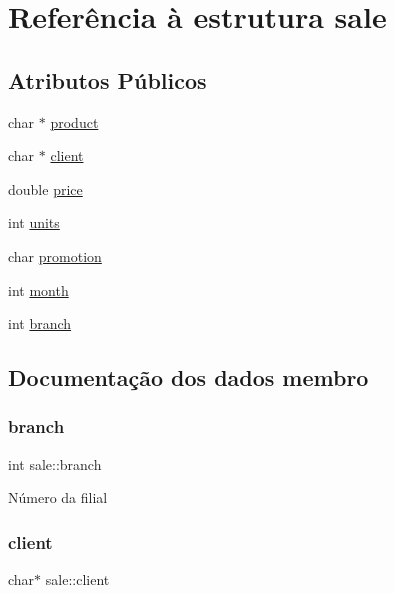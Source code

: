 \hypertarget{structsale}{}\section{Referência à estrutura sale}
\label{structsale}
\subsection*{Atributos Públicos}
\begin{DoxyCompactItemize}
\item 
char $\ast$ \hyperlink{structsale_af5a0d80c7b391b3af4086f9f2b6dfc33}{product}
\item 
char $\ast$ \hyperlink{structsale_a06b3ef63675cd114b96055ab3d0e610e}{client}
\item 
double \hyperlink{structsale_aa7a6fc25a883e1f75dcc71c3dc0cef53}{price}
\item 
int \hyperlink{structsale_a828620c0d49283dfbf8b4ea0a5606de8}{units}
\item 
char \hyperlink{structsale_a36cc49d9b3452fef223119fb4fa02938}{promotion}
\item 
int \hyperlink{structsale_a254bdac756c48cd89f0f34b041263f27}{month}
\item 
int \hyperlink{structsale_ab57ab037a04d7be9f61ecea3a49a61b3}{branch}
\end{DoxyCompactItemize}


\subsection{Documentação dos dados membro}
\mbox{\label{structsale_ab57ab037a04d7be9f61ecea3a49a61b3}} 
\subsubsection{\texorpdfstring{branch}{branch}}
{\footnotesize\ttfamily int sale\+::branch}

Número da filial \mbox{\label{structsale_a06b3ef63675cd114b96055ab3d0e610e}} 
\subsubsection{\texorpdfstring{client}{client}}
{\footnotesize\ttfamily char$\ast$ sale\+::client}


